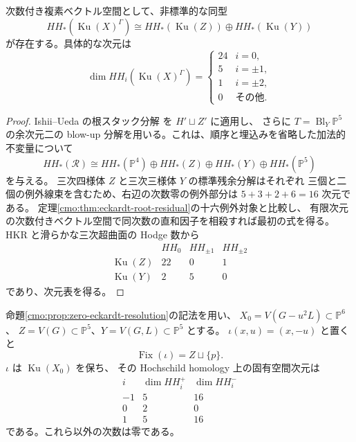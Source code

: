 \begin{corollary}[同変 Hochschild 群]
\label{cmo:cor:eckardt-equivariant-hh}
次数付き複素ベクトル空間として、非標準的な同型
\[
 HH_*(\operatorname{Ku}(X)^\Gamma)
 \cong HH_*(\operatorname{Ku}(Z))\oplus
         HH_*(\operatorname{Ku}(Y))
\]
が存在する。具体的な次元は
\[
 \dim HH_i(\operatorname{Ku}(X)^\Gamma)=
 \begin{cases}
 24&i=0,\\
 5&i=\pm1,\\
 1&i=\pm2,\\
 0&\text{その他}.
 \end{cases}
\]
\end{corollary}

\begin{proof}
Ishii--Ueda の根スタック分解
\cite[Theorem~1.6]{CMOIshiiUedaRoot}を $H'\sqcup Z'$ に適用し、
さらに $T=\operatorname{Bl}_Y\mathbb P^5$ の余次元二の blow-up
分解を用いる。これは、順序と埋込みを省略した加法的不変量について
\[
 HH_*(\mathcal R)\cong
 HH_*(\mathbb P^4)\oplus HH_*(Z)\oplus
 HH_*(Y)\oplus HH_*(\mathbb P^5)
\]
を与える。
三次四様体 $Z$ と三次三様体 $Y$ の標準残余分解はそれぞれ
三個と二個の例外線束を含むため、右辺の次数零の例外部分は
$5+3+2+6=16$ 次元である。
定理\ref{cmo:thm:eckardt-root-residual}の十六例外対象と比較し、
有限次元の次数付きベクトル空間で同次数の直和因子を相殺すれば最初の式を得る。
HKR と滑らかな三次超曲面の Hodge 数から
\[
 \begin{array}{c|ccc}
 &HH_0&HH_{\pm1}&HH_{\pm2}\\\hline
 \operatorname{Ku}(Z)&22&0&1\\
 \operatorname{Ku}(Y)&2&5&0
 \end{array}
\]
であり、次元表を得る。
\end{proof}

\begin{proposition}[零係数の明示可換候補における対合指標]
\label{cmo:prop:zero-involution-hh}
命題\ref{cmo:prop:zero-eckardt-resolution}の記法を用い、
$X_0=V(G-u^2L)\subset\mathbb P^6$、
$Z=V(G)\subset\mathbb P^5$、$Y=V(G,L)\subset\mathbb P^5$ とする。
$\iota(x,u)=(x,-u)$ と置くと
\[
 \operatorname{Fix}(\iota)=Z\sqcup\{p\}.
\]
$\iota$ は $\operatorname{Ku}(X_0)$ を保ち、
その Hochschild homology 上の固有空間次元は
\[
\begin{array}{c|rr}
 i&\dim HH_i^+&\dim HH_i^-\\ \hline
 -1&5&16\\
 0&2&0\\
 1&5&16
\end{array}
\]
である。これら以外の次数は零である。
\end{proposition}

